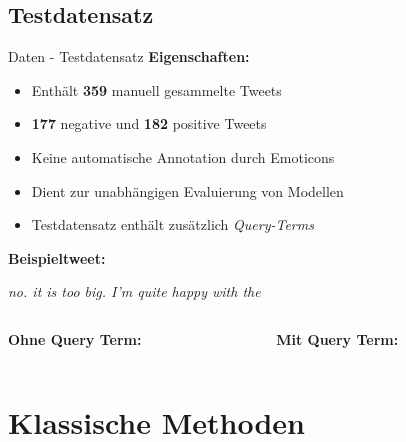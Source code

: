 \documentclass[aspectratio=169]{beamer}
\begin{document}
\subsection{Testdatensatz}

\begin{frame}{Daten - Testdatensatz}
	\textbf{Eigenschaften:}
	\begin{itemize}
		\item Enthält \textbf{359} manuell gesammelte Tweets
		\item \textbf{177} negative und \textbf{182} positive Tweets
		\item Keine automatische Annotation durch Emoticons
		\item Dient zur unabhängigen Evaluierung von Modellen
		\item Testdatensatz enthält zusätzlich \textit{Query-Terms}
	\end{itemize}

	\vspace{0.5cm}
	\textbf{Beispieltweet:}

	\begin{center}
		\glqq \textit{no. it is too big. I'm quite happy with the \grqq}
		\vspace{0.25cm}
		\begin{columns}
			\begin{column}{0.45\textwidth}
				\textbf{Ohne Query Term: }
			\end{column}
			\begin{column}{0.45\textwidth}
				\textbf{Mit Query Term: }
			\end{column}
		\end{columns}
	\end{center}
\end{frame}


\section{Klassische Methoden}
\end{document}

